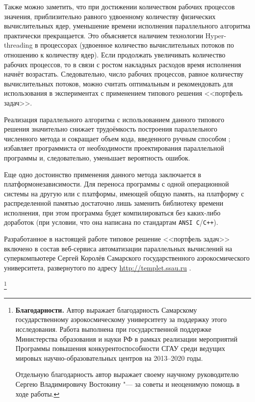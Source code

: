 Также можно заметить, что при достижении количеством рабочих процессов значения, приблизительно равного удвоенному количеству физических вычислительных ядер, уменьшение времени исполнения параллельного алгоритма практически прекращается. Это объясняется наличием технологии Hyper-threading в процессорах (удвоенное количество вычислительных потоков по отношению к количеству ядер). Если продолжать увеличивать количество рабочих процессов, то в связи с ростом накладных расходов время исполнения начнёт возрастать. Следовательно, число рабочих процессов, равное количеству вычислительных потоков, можно считать оптимальным и рекомендовать для использования в экспериментах с применением типового решения <<портфель задач>>.



Реализация параллельного алгоритма с использованием данного типового решения значительно снижает трудоёмкость построения параллельного численного метода и сокращает объем кода, введенного ручным способом \cite{VostKhayrLitv2011GPT}; избавляет программиста от необходимости проектирования параллельной программы и, следовательно, уменьшает вероятность ошибок.



Еще одно достоинство применения данного метода заключается в платформонезависимости. Для переноса программы с одной операционной системы на другую или с платформы, имеющей общую память, на платформу с распределенной памятью достаточно лишь заменить библиотеку времени исполнения, при этом программа будет компилироваться без каких-либо доработок (при условии, что она написана по стандартам {\tt ANSI С}/{\tt С++}).



Разработанное в настоящей работе типовое решение <<портфель задач>> включено в состав веб-сервиса автоматизации параллельных вычислений на суперкомпьютере Сергей Королёв Самарского государственного аэрокосмического университета, развернутого по адресу \url{http://templet.ssau.ru} \cite{ArtamVostNazar2012IntegrationService}.



{\thanks{{\bf Благодарности.} Автор выражает благодарность Самарскому государственному аэрокосмическому университету за поддержку этого исследования. Работа выполнена при государственной поддержке Министерства образования и науки РФ в рамках реализации мероприятий Программы повышения конкурентоспособности СГАУ среди ведущих мировых научно-образовательных центров на 2013--2020 годы.



Отдельную благодарность автор выражает своему научному руководителю Сергею Владимировичу Востокину "--- за советы и неоценимую помощь в ходе работы.}}




